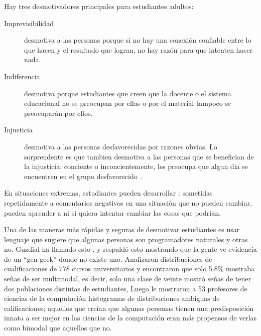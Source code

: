 Hay tres desmotivadores principales para estudiantes adultos:

\begin{description}

\item[Imprevisibilidad]
  desmotiva a las personas porque
  si no hay una conexión confiable entre lo que hacen y el resultado que logran,
  no hay razón para que intenten hacer nada.

\item[Indiferencia]
  desmotiva porque
  estudiantes que creen que la docente o el sistema educacional no se preocupan por ellas
  o por el material tampoco se preocuparán por ellos.

\item[Injusticia]
  desmotiva a las personas desfavorecidas por razones obvias.
  Lo sorprendente es que tambien desmotiva a las personas que se benefician de la injusticia:
  conciente o inconcientemente,
  les preocupa que
  algun dia se encuentren en el grupo desfavorecido~\cite{Wilk2011}.

\end{description}

En situaciones extremas,
estudiantes pueden desarrollar :
sometidas repetidamente a comentarios negativos en una situación que no pueden cambiar,
pueden aprender a ni si quiera intentar cambiar las cosas que podrían.

Una de las maneras más rápidas y seguras de desmotivar estudiantes es
usar lenguaje que sugiere que algunas personas son programadores naturales y otras no.
Guzdial ha llamado esto
,
y \cite{Pati2016} respaldó esto mostrando que
la gente ve evidencia de un ``gen geek” donde no existe uno.
Analizaron distribuciones de cualificaciones de 778 cursos universitarios y encontraron que solo 5.8\% mostraba señas
de ser multimodal,
es decir, solo una clase de veinte mostró señas de tener dos poblaciones distintas de estudiantes,
Luego le mostraron a 53 profesores de ciencias de la computación histogramas de distribuciones ambiguas de calificaciones;
aquellos que creían que algunas personas tienen una predisposición innata a ser mejor en las ciencias de la computación
eran más propensos de verlas como bimodal que aquellos que no.

